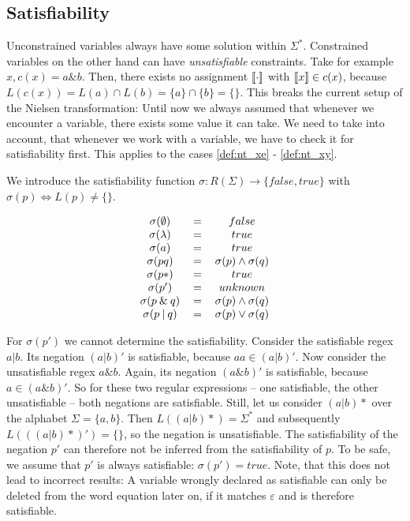 \subsection {Satisfiability}
Unconstrained variables always have some solution within $\Sigma^*$. Constrained variables on the other hand can have \textit{unsatisfiable} constraints. Take for example $x, c(x) = a\&b$. Then, there exists no assignment $\llbracket \cdot \rrbracket$ with $\llbracket x \rrbracket \in c(x)$, because $L(c(x)) = L(a) \cap L(b) = \{a\} \cap \{b\} = \{\}$. This breaks the current setup of the Nielsen transformation: Until now we always assumed that whenever we encounter a variable, there exists some value it can take. We need to take into account, that whenever we work with a variable, we have to check it for satisfiability first. This applies to the cases \ref{def:nt_xe} - \ref{def:nt_xy}.

We introduce the satisfiability function $\sigma: R(\Sigma) \rightarrow \{false, true\}$ with $\sigma(p) \Leftrightarrow L(p) \neq \{\}$.

\[
\begin{tabular}{c c c}
    $\sigma(\emptyset)$ & $=$ & $false$ \\
    $\sigma(\lambda)$ & $=$ & $true$ \\
    $\sigma(a)$ & $=$ & $true$ \\
    $\sigma(pq)$ & $=$ & $\sigma(p) \land \sigma(q)$ \\
    $\sigma(p*)$ & $=$ & $true$ \\
    $\sigma(p')$ & $=$ & $unknown$ \\
    $\sigma(p\:\&\:q)$ & $=$ & $\sigma(p) \land \sigma(q)$ \\
    $\sigma(p\:|\:q)$ & $=$ & $ \sigma(p) \lor \sigma(q)$ \\
\end{tabular}
\]

For $\sigma(p')$ we cannot determine the satisfiability. Consider the satisfiable regex $a|b$. Its negation $(a|b)'$ is satisfiable, because $aa \in (a|b)'$. Now consider the unsatisfiable regex $a\&b$. Again, its negation $(a\&b)'$ is satisfiable, because $a \in (a\&b)'$. So for these two regular expressions -- one satisfiable, the other unsatisfiable -- both negations are satisfiable. Still, let us consider $(a|b)*$ over the alphabet $\Sigma = \{a, b\}$. Then $L((a|b)*) = \Sigma^*$ and subsequently $L(((a|b)*)') = \{\}$, so the negation is unsatisfiable. The satisfiability of the negation $p'$ can therefore not be inferred from the satisfiability of $p$. To be safe, we assume that $p'$ is always satisfiable: $\sigma(p') = true$. Note, that this does not lead to incorrect results: A variable wrongly declared as satisfiable can only be deleted from the word equation later on, if it matches $\varepsilon$ and is therefore satisfiable.

